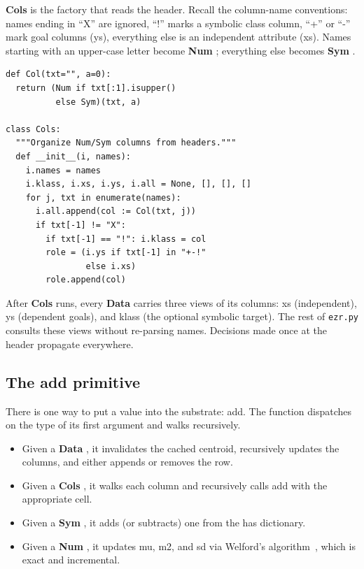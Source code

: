 \documentclass[AMA,STIX2COL]{WileyNJDv5}
\newcommand{\cls}[1]{%
  \setlength{\fboxsep}{1.5pt}%
  \colorbox{clsbg}{\sffamily\bfseries{#1}}%
}
\begin{document}
\cls{Cols} is the factory that reads the header. Recall the
column-name conventions: names ending in ``X'' are ignored,
``!'' marks a symbolic class column, ``+'' or ``-'' mark goal
columns (\textsf{ys}), everything else is an independent
attribute (\textsf{xs}). Names starting with an upper-case
letter become \cls{Num}; everything else becomes \cls{Sym}.

\begin{verbatim}
def Col(txt="", a=0):
  return (Num if txt[:1].isupper()
          else Sym)(txt, a)

class Cols:
  """Organize Num/Sym columns from headers."""
  def __init__(i, names):
    i.names = names
    i.klass, i.xs, i.ys, i.all = None, [], [], []
    for j, txt in enumerate(names):
      i.all.append(col := Col(txt, j))
      if txt[-1] != "X":
        if txt[-1] == "!": i.klass = col
        role = (i.ys if txt[-1] in "+-!"
                else i.xs)
        role.append(col)
\end{verbatim}

After \cls{Cols} runs, every \cls{Data} carries three views of
its columns: \textsf{xs} (independent), \textsf{ys} (dependent
goals), and \textsf{klass} (the optional symbolic target). The
rest of \texttt{ezr.py} consults these views without re-parsing
names. Decisions made once at the header propagate everywhere.

\subsection{The \textsf{add} primitive}

There is one way to put a value into the substrate: \textsf{add}.
The function dispatches on the type of its first argument and
walks recursively.

\begin{itemize}
\item Given a \cls{Data}, it invalidates the cached centroid,
recursively updates the columns, and either appends or removes
the row.
\item Given a \cls{Cols}, it walks each column and recursively
calls \textsf{add} with the appropriate cell.
\item Given a \cls{Sym}, it adds (or subtracts) one from the
\textsf{has} dictionary.
\item Given a \cls{Num}, it updates \textsf{mu}, \textsf{m2}, and
\textsf{sd} via Welford's algorithm~\cite{Knuth1998TAOCP2},
which is exact and incremental.
\end{itemize}
\end{document}
